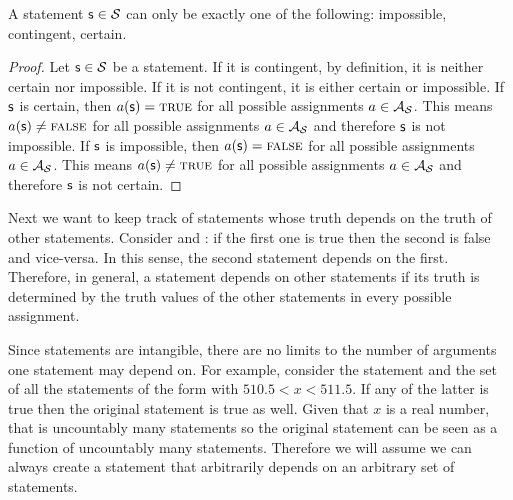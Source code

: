 \begin{mathSection}
	\begin{coro}
		A statement $\mathsf{s} \in \mathcal{S}$ can only be exactly one of the following: impossible, contingent, certain.
	\end{coro}
	
	\begin{proof}
		Let $\mathsf{s} \in \mathcal{S}$ be a statement. If it is contingent, by definition, it is neither certain nor impossible. If it is not contingent, it is either certain or impossible. If $\mathsf{s}$ is certain, then $a(\mathsf{s}) = \textup{\textsc{true}}$ for all possible assignments $a \in \mathcal{A}_{\mathcal{S}}$. This means $a(\mathsf{s}) \neq \textup{\textsc{false}}$ for all possible assignments $a \in \mathcal{A}_{\mathcal{S}}$ and therefore $\mathsf{s}$ is not impossible. If $\mathsf{s}$ is impossible, then $a(\mathsf{s}) = \textup{\textsc{false}}$ for all possible assignments $a \in \mathcal{A}_{\mathcal{S}}$. This means $a(\mathsf{s}) \neq \textup{\textsc{true}}$ for all possible assignments $a \in \mathcal{A}_{\mathcal{S}}$ and therefore $\mathsf{s}$ is not certain.
	\end{proof}
	
\end{mathSection}

Next we want to keep track of statements whose truth depends on the truth of other statements. Consider  and : if the first one is true then the second is false and vice-versa. In this sense, the second statement depends on the first. Therefore, in general, a statement depends on other statements if its truth is determined by the truth values of the other statements in every possible assignment.

Since statements are intangible, there are no limits to the number of arguments one statement may depend on. For example, consider the statement  and the set of all the statements of the form  with $510.5 < x < 511.5$. If any of the latter is true then the original statement is true as well. Given that $x$ is a real number, that is uncountably many statements so the original statement can be seen as a function of uncountably many statements. Therefore we will assume we can always create a statement that arbitrarily depends on an arbitrary set of statements.

